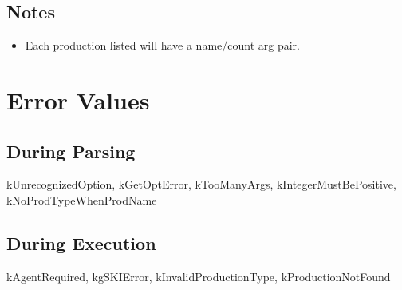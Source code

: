 \documentclass[10pt]{article}
\begin{document}
\subsection*{ Notes }
\begin{itemize}
\item  Each production listed will have a name/count arg pair. 

\end{itemize}
\section*{ Error Values }
\subsection*{ During Parsing }


 kUnrecognizedOption, kGetOptError, kTooManyArgs, kIntegerMustBePositive, kNoProdTypeWhenProdName
\subsection*{ During Execution }


 kAgentRequired, kgSKIError, kInvalidProductionType, kProductionNotFound
\end{document}
